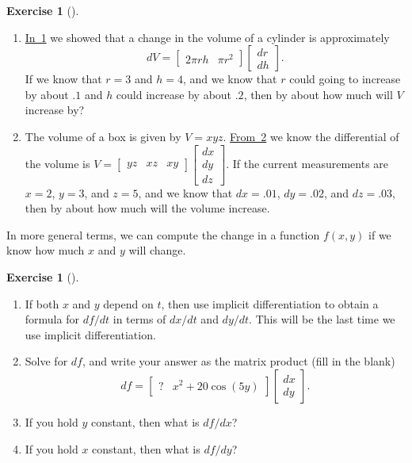 \documentclass[10pt,]{book}
\theoremstyle{plain}
\theoremstyle{definition}
\theoremstyle{definition}
\theoremstyle{definition}
\theoremstyle{definition}
\newtheorem{exploration}[project]{Exercise}
\theoremstyle{definition}
\numberwithin{equation}{section}
\newcommand{\amp}{&}
\begin{document}
\begin{exploration}[]\label{exploration-134}
\leavevmode%
\begin{enumerate}[font=\bfseries,label=(\alph*),ref=\alph*]
\item\label{task-279} \hyperref[prob_differential_volume_of_a_cylinder]{In~1} we showed that a change in the volume of a cylinder is approximately%
\begin{equation*}
dV = \begin{bmatrix}2\pi rh\amp  \pi r^2
\end{bmatrix} \begin{bmatrix}dr\\dh
\end{bmatrix} .
\end{equation*}
If we know that \(r=3\) and \(h=4\), and we know that \(r\) could going to increase by about \(.1\) and \(h\) could increase by about \(.2\), then by about how much will \(V\) increase by?%
\item\label{task-280} The volume of a box is given by \(V=xyz\). \hyperref[prob_volumebox]{From~2} we know the differential of the volume is \(V=\begin{bmatrix}yz\amp  xz \amp  xy
\end{bmatrix} \begin{bmatrix}dx\\dy\\dz
\end{bmatrix}\). If the current measurements are \(x=2\), \(y=3\), and \(z=5\), and we know that \(dx=.01\), \(dy=.02\), and \(dz=.03\), then by about how much will the volume increase.%
\end{enumerate}
\end{exploration}
In more general terms, we can compute the change in a function \(f(x,y)\) if we know how much \(x\) and \(y\) will change.%
\begin{exploration}[]\label{unit6_content}
\leavevmode%
\begin{enumerate}[font=\bfseries,label=(\alph*),ref=\alph*]
\item\label{task-281} If both \(x\) and \(y\) depend on \(t\), then use implicit differentiation to obtain a formula for \(df/dt\) in terms of \(dx/dt\) and \(dy/dt\). This will be the last time we use implicit differentiation.%
\item\label{task-282} Solve for \(df\), and write your answer as the matrix product (fill in the blank)%
\begin{equation*}
df = \begin{bmatrix}?\amp  x^2+20\cos(5y)
\end{bmatrix} \begin{bmatrix}dx\\dy
\end{bmatrix} .
\end{equation*}
%
\item\label{task-283} If you hold \(y\) constant, then what is \(df/dx\)?%
\item\label{task-284} If you hold \(x\) constant, then what is \(df/dy\)?%
\end{enumerate}
\end{exploration}
\end{document}
